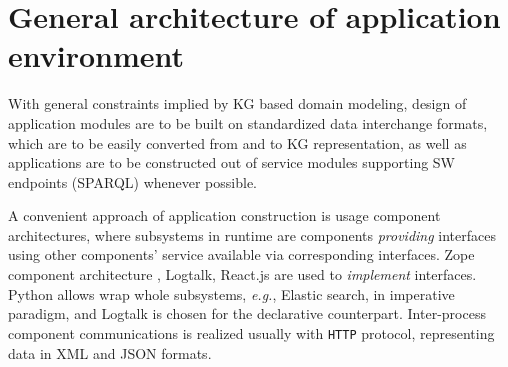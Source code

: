 \documentclass[
]{ceurart}
\begin{document}

\section{General architecture of application environment}
\label{sec:architecture}

With general constraints implied by KG based domain modeling, design of application modules are to be built on standardized data interchange formats, which are to be easily converted from and to KG representation, as well as applications are to be constructed out of service modules supporting SW endpoints (SPARQL) whenever possible.

A convenient approach of application construction is usage component architectures, where subsystems in runtime are components \emph{providing} interfaces using other components' service available via corresponding interfaces.  Zope component architecture \cite{zca}, Logtalk, React.js are used to \emph{implement} interfaces.  Python allows wrap whole subsystems, \emph{e.g.}, Elastic search, in imperative paradigm, and Logtalk is chosen for the declarative counterpart.  Inter-process component communications is realized usually with \texttt{HTTP} protocol, representing data in XML and JSON formats.
\end{document}
